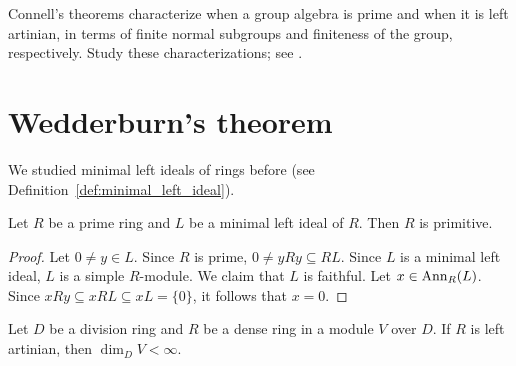 


\project

Connell's theorems characterize when a group algebra is prime
and when it is left artinian, in terms of finite normal subgroups
and finiteness of the group, respectively.
Study these characterizations; see \cite{MR798076}.

\section{Wedderburn's theorem}

We studied minimal left ideals of rings before (see Definition~\ref{def:minimal_left_ideal}).  

\begin{lemma}
	\label{lem:primoizqmin=>prim}
	Let $R$ be a prime ring and $L$ be a minimal left ideal of $R$.
	Then $R$ is primitive. 
\end{lemma}

\begin{proof}
	Let $0\ne y\in L$. Since $R$ is prime, $0\ne yRy\subseteq RL$. Since $L$ is a minimal left ideal, 
	$L$ is a simple $R$-module.  
	We claim that $L$ is faithful. Let 
	$x\in\operatorname{Ann}_R(L)$. Since $xRy\subseteq xRL\subseteq xL=\{0\}$, it follows that 
	$x=0$.
\end{proof}

\begin{lemma}
	\label{lem:denso_artiniano}
	Let $D$ be a division ring and $R$ be a dense ring in a module $V$ over $D$. 
	If $R$ is left artinian, then $\dim_DV<\infty$.
\end{lemma}

